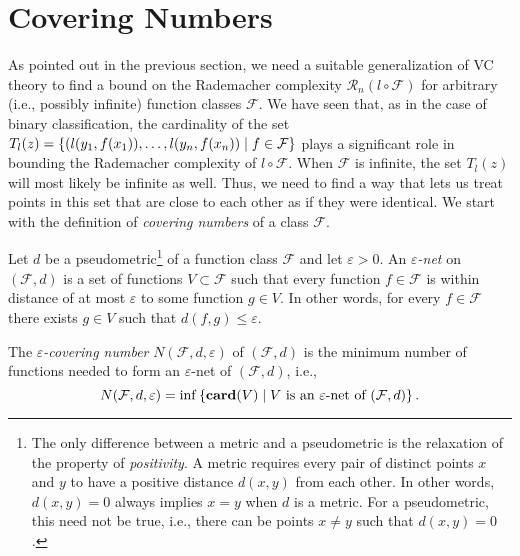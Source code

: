 \section{Covering Numbers}

As pointed out in the previous section, we need a suitable generalization of VC theory to find a bound on the Rademacher complexity $\mathcal{R}_n(l \circ \mathcal{F})$ for arbitrary (i.e., possibly infinite) function classes $\mathcal{F}$. We have seen that, as in the case of binary classification, the cardinality of the set $T_l(z) = \left\{(l(y_1, f(x_1)), \dots, l(y_n, f(x_n)) \mathrel{|} f \in \mathcal{F}\right\}$ plays a significant role in bounding the Rademacher complexity of $l \circ \mathcal{F}$. When $\mathcal{F}$ is infinite, the set $T_l(z)$ will  most likely be infinite as well. Thus, we need to find a way that lets us treat points in this set that are close to each other as if they were identical. We start with the definition of \emph{covering numbers} of a class $\mathcal{F}$.

\begin{definition}
Let $d$ be a pseudometric\footnote{The only difference between a metric and a pseudometric is the relaxation of the property of \emph{positivity}. A metric requires every pair of distinct points $x$ and $y$ to have a positive distance $d(x, y)$ from each other. In other words, $d(x, y) = 0$ always implies $x = y$ when $d$ is a metric. For a pseudometric, this need not be true, i.e., there can be points $x \neq y$ such that $d(x, y) = 0$.} of a function class $\mathcal{F}$ and let $\varepsilon > 0$. An \emph{$\varepsilon$-net} on $(\mathcal{F}, d)$ is a set of functions $V \subset \mathcal{F}$ such that every function $f \in \mathcal{F}$ is within distance of at most $\varepsilon$ to some function $g \in V$. In other words, for every $f \in \mathcal{F}$ there exists $g \in V$ such that $d(f, g) \leq \varepsilon$.

The \emph{$\varepsilon$-covering number} $N(\mathcal{F}, d, \varepsilon)$ of $(\mathcal{F}, d)$ is the minimum number of functions needed to form an $\varepsilon$-net of $(\mathcal{F}, d)$, i.e.,
\[
    N(\mathcal{F}, d, \varepsilon) = \inf\left\{\mathrm{\mathbf{card}}(V) \mathrel{|} V \text{ is an } \varepsilon \text{-net of } (\mathcal{F}, d)\right\}.
\]
\end{definition}

